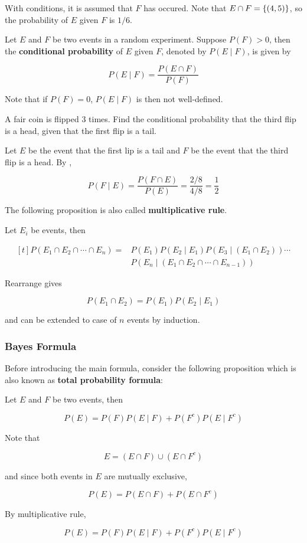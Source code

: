 \documentclass[a4paper,12pt]{article}
\begin{document}
With conditions, it is assumed that $F$ has occured. Note that $E\cap F=\left\{ (4,5)\right\}$, so the probability of $E$ given $F$ is $1/6$.\n

\begin{dft}
  Let $E$ and $F$ be two events in a random experiment. Suppose $P(F)>0$, then the \textbf{conditional probability} of $E$ given $F$, denoted by $P(E\mid F)$, is given by

  $$P(E\mid F)=\frac{P(E\cap F)}{P(F)}$$
\end{dft}\n

Note that if $P(F)=0$, $P(E\mid F)$ is then not well-defined.\n

\begin{exm}
  A fair coin is flipped $3$ times. Find the conditional probability that the third flip is a head, given that the first flip is a tail.\n

  \ans Let $E$ be the event that the first lip is a tail and $F$ be the event that the third flip is a head. By \rdft[\sctr{1}],

  $$P(F\mid E)=\frac{P(F\cap E)}{P(E)}=\frac{2/8}{4/8}=\frac{1}{2}$$\s
\end{exm}\n

The following proposition is also called \textbf{multiplicative rule}.\n

\begin{pst}
  Let $E_{i}$ be events, then

  $$\begin{aligned}[t]
    P(E_{1}\cap E_{2}\cap\cdots\cap E_{n})=&P(E_{1})P(E_{2}\mid E_{1})P(E_{3}\mid(E_{1}\cap E_{2}))\cdots\\
    &P(E_{n}\mid(E_{1}\cap E_{2}\cap\cdots\cap E_{n-1}))
  \end{aligned}$$\s

  \prf Rearrange \rdft[\sctr{2}] gives

  $$P(E_{1}\cap E_{2})=P(E_{1})P(E_{2}\mid E_{1})$$\s

  and can be extended to case of $n$ events by induction.
\end{pst}

\subsubsection{Bayes Formula}
Before introducing the main formula, consider the following proposition which is also known as \textbf{total probability formula}:\n

\begin{pst}
  Let $E$ and $F$ be two events, then

  $$P(E)=P(F)P(E\mid F)+P(F^{c})P(E\mid F^{c})$$\s

  \prf Note that

  $$E=(E\cap F)\cup(E\cap F^{c})$$\s

  and since both events in $E$ are mutually exclusive,

  $$P(E)=P(E\cap F)+P(E\cap F^{c})$$\s

  By multiplicative rule,

  $$P(E)=P(F)P(E\mid F)+P(F^{c})P(E\mid F^{c})$$
\end{pst}\n
\end{document}
